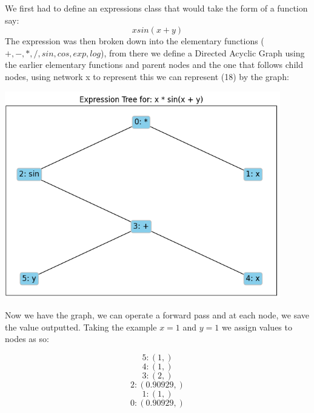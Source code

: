 \documentclass{article}
\begin{document}
We first had to define an expressions class that would take the form of a function say:
\begin{equation}
xsin(x+y)
\end{equation}
The expression was then broken down into the elementary functions ($+, -, *, /, sin, cos, exp, log$), from there we define a Directed Acyclic Graph using the earlier elementary functions and parent nodes and the one that follows child nodes, using network x to represent this we can represent (18) by the graph:

\begin{center}
    \includegraphics[width=12cm]{images/DAG_1.png}
\end{center}

Now we have the graph, we can operate a forward pass and at each node, we save the value outputted. Taking the example $x = 1$ and $y = 1$ we assign values to nodes as so:

\begin{equation*}
    5: (1, ) 
\end{equation*}
\begin{equation*}
    4: (1, )
\end{equation*}
\begin{equation*}
    3: (2, )
\end{equation*}
\begin{equation*}
    2: (0.90929, )
\end{equation*}
\begin{equation*}
    1: (1, )
\end{equation*}
\begin{equation*}
    0: (0.90929, )
\end{equation*}
\end{document}
